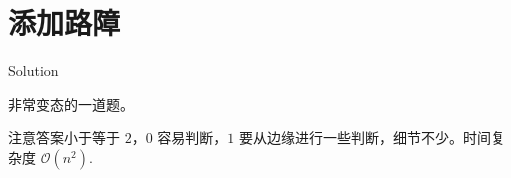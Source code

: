 \section{添加路障}

\begin{frame}{Solution}

非常变态的一道题。

注意答案小于等于 $2$，$0$ 容易判断，$1$ 要从边缘进行一些判断，细节不少。时间复杂度 $\mathcal O(n^2)$.

\end{frame}